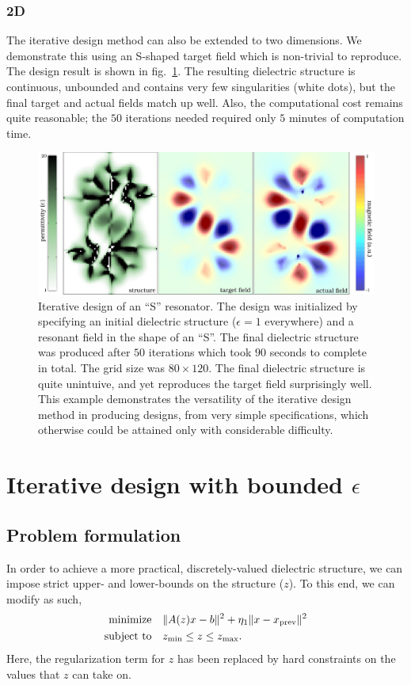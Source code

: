 \subsection{2D}
The iterative design method can also be extended to two dimensions.
We demonstrate this using an S-shaped target field 
    which is non-trivial to reproduce. 
The design result is shown in fig.~\ref{S pic}. 
    The resulting dielectric structure is continuous, unbounded and 
    contains very few singularities (white dots), 
    but the final target and actual fields match up well. 
Also, the computational cost remains quite reasonable; the $50$ iterations needed required only $5$ minutes of computation time. 
\begin{figure}\centering
\includegraphics[width=\textwidth]{p1/S}
\caption{Iterative design of an ``S'' resonator. 
The design was initialized by specifying an initial dielectric structure ($\epsilon=1$ everywhere) and a resonant field in the shape of an ``S''. 
The final dielectric structure was produced after $50$ iterations which took $90$ seconds to complete in total. The grid size was $80\times 120$. The final dielectric structure is quite unintuive, and yet reproduces the target field surprisingly well. This example demonstrates the versatility of the iterative design method in producing designs, from very simple specifications, which otherwise could be attained only with considerable difficulty.}
\label{S pic}
\end{figure}

\chapter{Iterative design with bounded $\epsilon$} \label{bounded}
\section{Problem formulation}
In order to achieve a more practical, discretely-valued dielectric structure, we can impose strict upper- and lower-bounds on the structure ($z$). 
To this end, we can modify  as such,
    \begin{subequations}
    \begin{align} 
    \operatorname*{\text{minimize}\quad} & \|A(z)x - b\|^2 + \eta_1\|x - x_\text{prev}\|^2\\
    \text{subject to}\quad & z_\text{min} \le z \le z_\text{max}. 
    \end{align}\label{bounded problem}
    \end{subequations}
Here, the regularization term for $z$ has been replaced by hard constraints
    on the values that $z$ can take on.

